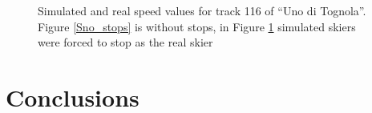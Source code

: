 \documentclass[12pt,a4paper,twoside]{book}
\begin{document}
\begin{figure}[!h]
\begin{subfigure}[b]{0.5\textwidth}
                \caption{}
                \label{Sstops}
        \end{subfigure}
        \caption{Simulated and real speed values for track 116 of ``Uno di Tognola''. Figure \ref{Sno_stops} is without stops, in Figure \ref{Sstops} simulated skiers were forced to stop as the real skier}\label{sm_stops_track116}
\end{figure}

\chapter*{Conclusions}



\end{document}
